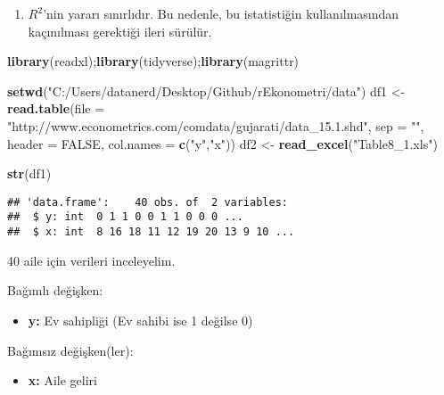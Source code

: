 \documentclass[
]{book}
\newenvironment{Shaded}{\begin{snugshade}}{\end{snugshade}}
\newcommand{\DataTypeTok}[1]{\textcolor[rgb]{0.13,0.29,0.53}{#1}}
\newcommand{\KeywordTok}[1]{\textcolor[rgb]{0.13,0.29,0.53}{\textbf{#1}}}
\newcommand{\NormalTok}[1]{#1}
\newcommand{\OtherTok}[1]{\textcolor[rgb]{0.56,0.35,0.01}{#1}}
\newcommand{\StringTok}[1]{\textcolor[rgb]{0.31,0.60,0.02}{#1}}
\providecommand{\tightlist}{%
  \setlength{\itemsep}{0pt}\setlength{\parskip}{0pt}}
\begin{document}
\begin{enumerate}
\def\labelenumi{\roman{enumi}.}
\setcounter{enumi}{3}
\tightlist
\item
  \(R^2\)'nin yararı sınırlıdır. Bu nedenle, bu istatistiğin kullanılmasından kaçınılması gerektiği ileri sürülür.
\end{enumerate}

\begin{Shaded}
\begin{Highlighting}[]
\KeywordTok{library}\NormalTok{(readxl);}\KeywordTok{library}\NormalTok{(tidyverse);}\KeywordTok{library}\NormalTok{(magrittr)}

\KeywordTok{setwd}\NormalTok{(}\StringTok{"C:/Users/datanerd/Desktop/Github/rEkonometri/data"}\NormalTok{)}
\NormalTok{df1 <-}\StringTok{ }\KeywordTok{read.table}\NormalTok{(}\DataTypeTok{file =} \StringTok{"http://www.econometrics.com/comdata/gujarati/data_15.1.shd"}\NormalTok{, }\DataTypeTok{sep =} \StringTok{""}\NormalTok{, }\DataTypeTok{header =} \OtherTok{FALSE}\NormalTok{, }\DataTypeTok{col.names =} \KeywordTok{c}\NormalTok{(}\StringTok{"y"}\NormalTok{,}\StringTok{"x"}\NormalTok{))}
\NormalTok{df2 <-}\StringTok{ }\KeywordTok{read_excel}\NormalTok{(}\StringTok{"Table8_1.xls"}\NormalTok{)}
\end{Highlighting}
\end{Shaded}

\begin{Shaded}
\begin{Highlighting}[]
\KeywordTok{str}\NormalTok{(df1)}
\end{Highlighting}
\end{Shaded}

\begin{verbatim}
## 'data.frame':    40 obs. of  2 variables:
##  $ y: int  0 1 1 0 0 1 1 0 0 0 ...
##  $ x: int  8 16 18 11 12 19 20 13 9 10 ...
\end{verbatim}

40 aile için verileri inceleyelim.

Bağımlı değişken:

\begin{itemize}
\tightlist
\item
  \textbf{y:} Ev sahipliği (Ev sahibi ise 1 değilse 0)
\end{itemize}

Bağımsız değişken(ler):

\begin{itemize}
\tightlist
\item
  \textbf{x:} Aile geliri
\end{itemize}
\end{document}
